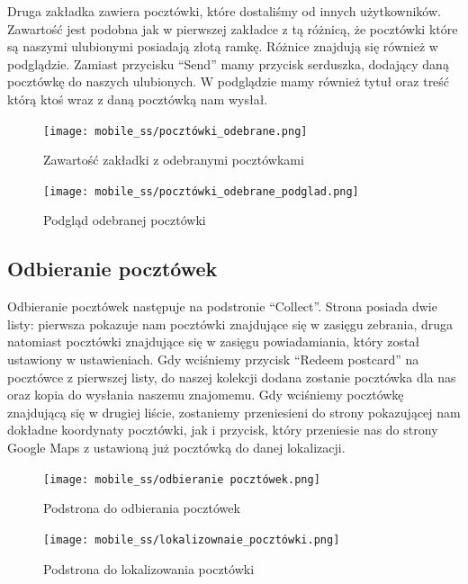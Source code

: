 \documentclass[a4paper,twoside,12pt]{book}
\begin{document}
Druga zakładka zawiera pocztówki, które dostaliśmy od innych użytkowników. Zawartość jest podobna jak w pierwszej zakładce z tą różnicą, że pocztówki które są naszymi ulubionymi posiadają złotą ramkę. Różnice znajdują się również w podglądzie. Zamiast przycisku ``Send'' mamy przycisk serduszka, dodający daną pocztówkę do naszych ulubionych.  W podglądzie mamy również tytuł oraz treść którą ktoś wraz z daną pocztówką nam wysłał.

\begin{figure}[H]
  \centering
  \begin{minipage}[b]{0.49\textwidth}
    \texttt{[image: mobile\_ss/pocztówki\_odebrane.png]}
    \caption{Zawartość zakładki z odebranymi pocztówkami}
  \end{minipage}
  \hfill
  \begin{minipage}[b]{0.49\textwidth}
    \texttt{[image: mobile\_ss/pocztówki\_odebrane\_podglad.png]}
    \caption{Podgląd odebranej pocztówki\\}
  \end{minipage}
\end{figure}

\subsection{Odbieranie pocztówek}

Odbieranie pocztówek następuje na podstronie ``Collect''. Strona posiada dwie listy: pierwsza pokazuje nam pocztówki znajdujące się w zasięgu zebrania, druga natomiast pocztówki znajdujące się w zasięgu powiadamiania, który został ustawiony w ustawieniach. Gdy wciśniemy przycisk ``Redeem postcard'' na pocztówce z pierwszej listy, do naszej kolekcji dodana zostanie pocztówka dla nas oraz kopia do wysłania naszemu znajomemu. Gdy wciśniemy pocztówkę znajdującą się w drugiej liście, zostaniemy przeniesieni do strony pokazującej nam dokładne koordynaty pocztówki, jak i przycisk, który przeniesie nas do strony Google Maps z ustawioną już pocztówką do danej lokalizacji.

\begin{figure}[H]
  \centering
  \begin{minipage}[b]{0.49\textwidth}
    \texttt{[image: mobile\_ss/odbieranie pocztówek.png]}
    \caption{Podstrona do odbierania pocztówek}
  \end{minipage}
  \hfill
  \begin{minipage}[b]{0.49\textwidth}
    \texttt{[image: mobile\_ss/lokalizownaie\_pocztówki.png]}
    \caption{Podstrona do lokalizowania pocztówki}
  \end{minipage}
\end{figure}
\end{document}
